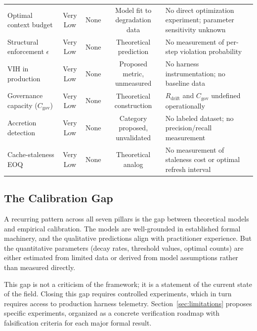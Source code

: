 \documentclass[11pt, a4paper, logo, copyright]{googledeepmind}
\begin{document}
\begin{table}[H]
\begin{tabular}{p{3cm}cccp{4.2cm}}
Optimal context budget & Very Low & None & Model fit to degradation data & No direct optimization experiment; parameter sensitivity unknown \\
\addlinespace
Structural enforcement $\epsilon$ & Very Low & None & Theoretical prediction & No measurement of per-step violation probability \\
\addlinespace
VIH in production & Very Low & None & Proposed metric, unmeasured & No harness instrumentation; no baseline data \\
\addlinespace
Governance capacity ($C_{\text{gov}}$) & Very Low & None & Theoretical construction & $R_{\text{drift}}$ and $C_{\text{gov}}$ undefined operationally \\
\addlinespace
Accretion detection & Very Low & None & Category proposed, unvalidated & No labeled dataset; no precision/recall measurement \\
\addlinespace
Cache-staleness EOQ & Very Low & None & Theoretical analog & No measurement of staleness cost or optimal refresh interval \\
\bottomrule
\end{tabular}
\end{table}

\subsection{The Calibration Gap}

A recurring pattern across all seven pillars is the gap between theoretical models and empirical calibration. The models are well-grounded in established formal machinery, and the qualitative predictions align with practitioner experience. But the quantitative parameters (decay rates, threshold values, optimal counts) are either estimated from limited data or derived from model assumptions rather than measured directly.

This gap is not a criticism of the framework; it is a statement of the current state of the field. Closing this gap requires controlled experiments, which in turn requires access to production harness telemetry. Section~\ref{sec:limitations} proposes specific experiments, organized as a concrete verification roadmap with falsification criteria for each major formal result.


\end{document}
